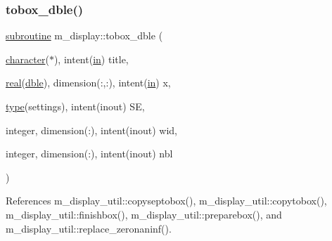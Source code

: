 \subsubsection{\texorpdfstring{tobox\+\_\+dble()}{tobox\_dble()}}
{\footnotesize\ttfamily \hyperlink{M__stopwatch_83_8txt_acfbcff50169d691ff02d4a123ed70482}{subroutine} m\+\_\+display\+::tobox\+\_\+dble (\begin{DoxyParamCaption}\item[{\hyperlink{option__stopwatch_83_8txt_abd4b21fbbd175834027b5224bfe97e66}{character}($\ast$), intent(\hyperlink{M__journal_83_8txt_afce72651d1eed785a2132bee863b2f38}{in})}]{title,  }\item[{\hyperlink{read__watch_83_8txt_abdb62bde002f38ef75f810d3a905a823}{real}(\hyperlink{namespacem__display_a46d90b75b6ccef7ccade133e5847e815}{dble}), dimension(\+:,\+:), intent(\hyperlink{M__journal_83_8txt_afce72651d1eed785a2132bee863b2f38}{in})}]{x,  }\item[{\hyperlink{stop__watch_83_8txt_a70f0ead91c32e25323c03265aa302c1c}{type}(settings), intent(inout)}]{SE,  }\item[{integer, dimension(\+:), intent(inout)}]{wid,  }\item[{integer, dimension(\+:), intent(inout)}]{nbl }\end{DoxyParamCaption})\hspace{0.3cm}{\ttfamily [private]}}



References m\+\_\+display\+\_\+util\+::copyseptobox(), m\+\_\+display\+\_\+util\+::copytobox(), m\+\_\+display\+\_\+util\+::finishbox(), m\+\_\+display\+\_\+util\+::preparebox(), and m\+\_\+display\+\_\+util\+::replace\+\_\+zeronaninf().

